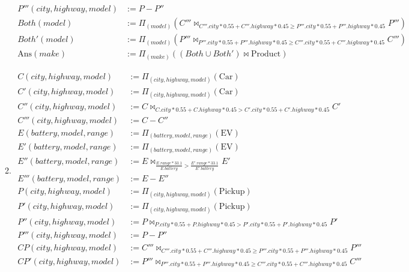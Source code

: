 \documentclass[12pt,letterpaper]{article}
\newcommand{\parens}[1]{\left(#1\right)}
\newcommand{\Ans}[0]{\text{Ans}}
\newcommand{\Car}[0]{\text{Car}}
\newcommand{\EV}[0]{\text{EV}}
\newcommand{\Pickup}[0]{\text{Pickup}}
\newcommand{\Product}[0]{\text{Product}}
\begin{document}
\begin{enumerate}
\begin{enumerate}
\begin{align*}
            P'''(city, highway, model) &:= P - P'' \\
            Both(model) &:= \Pi_{\parens{model}}\parens{C''' \bowtie_{C'''.city * 0.55 + C'''.highway * 0.45 \ge P'''.city * 0.55 + P'''.highway * 0.45} P'''} \\
            Both'(model) &:= \Pi_{\parens{model}}\parens{P''' \bowtie_{P'''.city * 0.55 + P'''.highway * 0.45 \ge C'''.city * 0.55 + C'''.highway * 0.45} C'''} \\
            \Ans(make) &:= \Pi_{\parens{make}}\parens{\parens{Both \cup Both'} \bowtie \Product}
          \end{align*}
        \item
          \begin{align*}
            C(city, highway, model) &:= \Pi_{\parens{city, highway, model}}\parens{\Car} \\
            C'(city, highway, model) &:= \Pi_{\parens{city, highway, model}}\parens{\Car} \\
            C''(city, highway, model) &:= C \bowtie_{C.city * 0.55 + C.highway * 0.45 > C'.city * 0.55 + C'.highway * 0.45} C' \\
            C'''(city, highway, model) &:= C - C'' \\
            E(battery, model, range) &:= \Pi_{\parens{battery, model, range}}\parens{\EV} \\
            E'(battery, model, range) &:= \Pi_{\parens{battery, model, range}}\parens{\EV} \\
            E''(battery, model, range) &:= E \bowtie_{\frac{E.range * 33.1}{E.battery} > \frac{E'.range * 33.1}{E'.battery}} E' \\
            E'''(battery, model, range) &:= E - E'' \\
            P(city, highway, model) &:= \Pi_{\parens{city, highway, model}}\parens{\Pickup} \\
            P'(city, highway, model) &:= \Pi_{\parens{city, highway, model}}\parens{\Pickup} \\
            P''(city, highway, model) &:= P \bowtie_{P.city * 0.55 + P.highway * 0.45 > P'.city * 0.55 + P'.highway * 0.45} P' \\
            P'''(city, highway, model) &:= P - P'' \\
            CP(city, highway, model) &:= C''' \bowtie_{C'''.city * 0.55 + C'''.highway * 0.45 \ge P'''.city * 0.55 + P'''.highway * 0.45} P''' \\
            CP'(city, highway, model) &:= P''' \bowtie_{P'''.city * 0.55 + P'''.highway * 0.45 \ge C'''.city * 0.55 + C'''.highway * 0.45} C''' \\

\end{align*}
\end{enumerate}
\end{enumerate}
\end{document}
